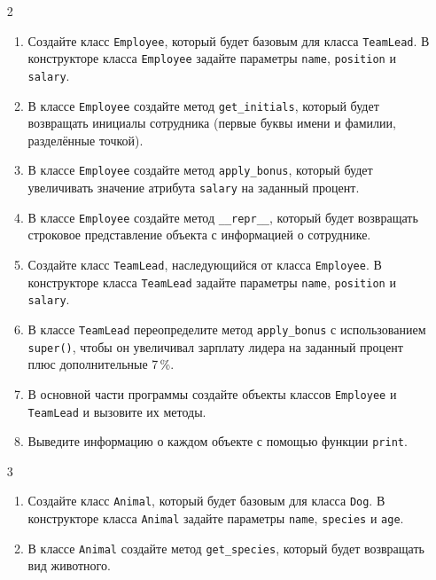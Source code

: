 \begin{enumerate}
\item[2] 
\begin{enumerate}
    \item Создайте класс \texttt{Employee}, который будет базовым для класса \texttt{TeamLead}. В конструкторе класса \texttt{Employee} задайте параметры \texttt{name}, \texttt{position} и \texttt{salary}.
    
    \item В классе \texttt{Employee} создайте метод \texttt{get\_initials}, который будет возвращать инициалы сотрудника (первые буквы имени и фамилии, разделённые точкой).
    
    \item В классе \texttt{Employee} создайте метод \texttt{apply\_bonus}, который будет увеличивать значение атрибута \texttt{salary} на заданный процент.
    
    \item В классе \texttt{Employee} создайте метод \texttt{\_\_repr\_\_}, который будет возвращать строковое представление объекта с информацией о сотруднике.
    
    \item Создайте класс \texttt{TeamLead}, наследующийся от класса \texttt{Employee}. В конструкторе класса \texttt{TeamLead} задайте параметры \texttt{name}, \texttt{position} и \texttt{salary}.
    
    \item В классе \texttt{TeamLead} переопределите метод \texttt{apply\_bonus} с использованием \texttt{super()}, чтобы он увеличивал зарплату лидера на заданный процент плюс дополнительные 7\,\%.
    
    \item В основной части программы создайте объекты классов \texttt{Employee} и \texttt{TeamLead} и вызовите их методы.
    
    \item Выведите информацию о каждом объекте с помощью функции \texttt{print}.
\end{enumerate}

\item[3] 
\begin{enumerate}
    \item Создайте класс \texttt{Animal}, который будет базовым для класса \texttt{Dog}. В конструкторе класса \texttt{Animal} задайте параметры \texttt{name}, \texttt{species} и \texttt{age}.
    
    \item В классе \texttt{Animal} создайте метод \texttt{get\_species}, который будет возвращать вид животного.
    

\end{enumerate}
\end{enumerate}
